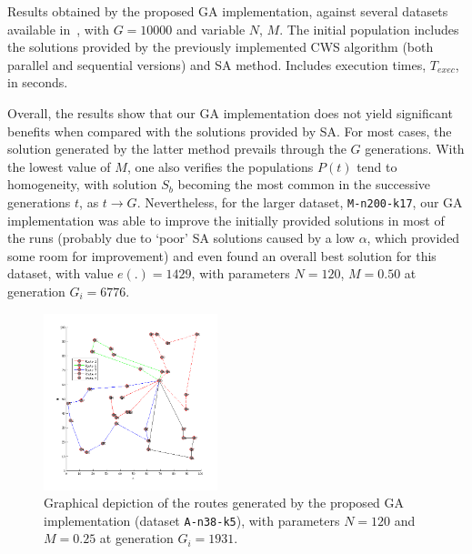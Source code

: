 \begin{table}[h!]
\begin{threeparttable}
    \caption{Results obtained by the proposed GA implementation, against 
            several datasets available in~\cite{website:cvrp-datasets}, with 
            $G = 10000$ and variable $N$, $M$. The initial population 
            includes the solutions provided by the previously implemented 
            CWS algorithm (both parallel and sequential versions) and SA method.  
            Includes execution times, $T_{exec}$, in seconds.}
    \label{tab:ga-results-1}
    \end{threeparttable}
\end{table}

Overall, the results show that our GA implementation does not yield significant 
benefits when compared with the solutions provided by SA. For most cases, the 
solution generated by the latter method prevails through the $G$ generations. 
With the lowest value of $M$, one also verifies the populations $P(t)$ tend to 
homogeneity, with solution $S_b$ becoming the most common in the successive 
generations $t$, as $t \rightarrow G$. Nevertheless, for the larger dataset, 
\verb?M-n200-k17?, our GA implementation was able to improve the initially 
provided solutions in most of the runs (probably due to `poor' SA solutions 
caused by a low $\alpha$, which provided some room for improvement) and even 
found an overall best solution for this dataset, with value $e(.) = 1429$, with 
parameters $N = 120$, $M = 0.50$ at generation $G_i = 6776$.\vertbreak 

\begin{figure}[h!]
    \centering

    \includegraphics[width=0.45\textwidth] {figures/A-n38-k5-s-ga.png}
    \cprotect\caption{Graphical depiction of the routes generated 
            by the proposed GA implementation (dataset \verb?A-n38-k5?), with 
            parameters $N = 120$ and $M = 0.25$ at generation $G_i = 1931$.}
    \label{fig:A-n38-k5-s-ga-graph}

\end{figure}

